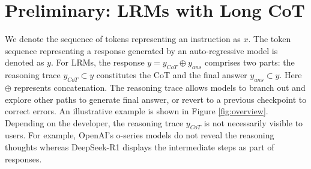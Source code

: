 \section{Preliminary: LRMs with Long CoT}
We denote the sequence of tokens representing an instruction as $x$.
The token sequence representing a response generated by an auto-regressive model is denoted as $y$.
For LRMs, the response $y=y_{CoT}\oplus y_{ans}$ comprises two parts: the reasoning trace $y_{CoT}\subset y$ constitutes the CoT and the final answer $y_{ans}\subset y$.
Here $\oplus$ represents concatenation. 
The reasoning trace allows models to branch out and explore other paths to generate final answer, or revert to a previous checkpoint to correct errors. 
An illustrative example is shown in Figure \ref{fig:overview}.
Depending on the developer, the reasoning trace $y_{CoT}$ is not necessarily visible to users.
For example, OpenAI's o-series models do not reveal the reasoning thoughts whereas DeepSeek-R1 displays the intermediate steps as part of responses.

